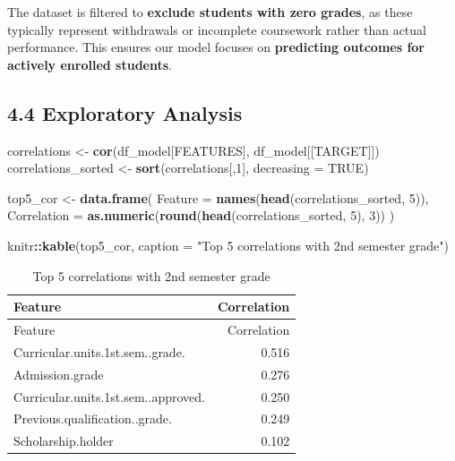 \documentclass[
]{article}
\newenvironment{Shaded}{\begin{snugshade}}{\end{snugshade}}
\newcommand{\AttributeTok}[1]{\textcolor[rgb]{0.13,0.29,0.53}{#1}}
\newcommand{\ConstantTok}[1]{\textcolor[rgb]{0.56,0.35,0.01}{#1}}
\newcommand{\DecValTok}[1]{\textcolor[rgb]{0.00,0.00,0.81}{#1}}
\newcommand{\FunctionTok}[1]{\textcolor[rgb]{0.13,0.29,0.53}{\textbf{#1}}}
\newcommand{\NormalTok}[1]{#1}
\newcommand{\OtherTok}[1]{\textcolor[rgb]{0.56,0.35,0.01}{#1}}
\newcommand{\SpecialCharTok}[1]{\textcolor[rgb]{0.81,0.36,0.00}{\textbf{#1}}}
\newcommand{\StringTok}[1]{\textcolor[rgb]{0.31,0.60,0.02}{#1}}
\begin{document}
The dataset is filtered to \textbf{exclude students with zero grades},
as these typically represent withdrawals or incomplete coursework rather
than actual performance. This ensures our model focuses on
\textbf{predicting outcomes for actively enrolled students}.

\subsection{4.4 Exploratory Analysis}\label{exploratory-analysis}

\begin{Shaded}
\begin{Highlighting}[]
\NormalTok{correlations }\OtherTok{\textless{}{-}} \FunctionTok{cor}\NormalTok{(df\_model[FEATURES], df\_model[[TARGET]])}
\NormalTok{correlations\_sorted }\OtherTok{\textless{}{-}} \FunctionTok{sort}\NormalTok{(correlations[,}\DecValTok{1}\NormalTok{], }\AttributeTok{decreasing =} \ConstantTok{TRUE}\NormalTok{)}

\NormalTok{top5\_cor }\OtherTok{\textless{}{-}} \FunctionTok{data.frame}\NormalTok{(}
  \AttributeTok{Feature =} \FunctionTok{names}\NormalTok{(}\FunctionTok{head}\NormalTok{(correlations\_sorted, }\DecValTok{5}\NormalTok{)),}
  \AttributeTok{Correlation =} \FunctionTok{as.numeric}\NormalTok{(}\FunctionTok{round}\NormalTok{(}\FunctionTok{head}\NormalTok{(correlations\_sorted, }\DecValTok{5}\NormalTok{), }\DecValTok{3}\NormalTok{))}
\NormalTok{)}

\NormalTok{knitr}\SpecialCharTok{::}\FunctionTok{kable}\NormalTok{(top5\_cor, }\AttributeTok{caption =} \StringTok{"Top 5 correlations with 2nd semester grade"}\NormalTok{)}
\end{Highlighting}
\end{Shaded}

\begin{longtable}[]{@{}lr@{}}
\caption{Top 5 correlations with 2nd semester grade}\tabularnewline
\toprule\noalign{}
Feature & Correlation \\
\midrule\noalign{}
\endfirsthead
\toprule\noalign{}
Feature & Correlation \\
\midrule\noalign{}
\endhead
\bottomrule\noalign{}
\endlastfoot
Curricular.units.1st.sem..grade. & 0.516 \\
Admission.grade & 0.276 \\
Curricular.units.1st.sem..approved. & 0.250 \\
Previous.qualification..grade. & 0.249 \\
Scholarship.holder & 0.102 \\
\end{longtable}
\end{document}
